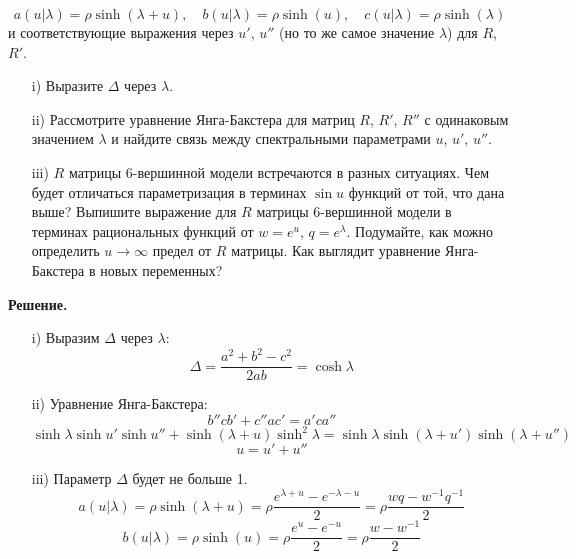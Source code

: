 \documentclass[12pt]{article}
\theoremstyle{definition}
\begin{document}
\begin{enumerate}
\begin{equation}
        a(u|\lambda)=\rho\sinh(\lambda+u),\quad b(u|\lambda)=\rho\sinh(u),\quad c(u|\lambda)=\rho\sinh(\lambda)
    \end{equation}
    и соответствующие выражения через $u'$, $u''$ (но то же самое значение $\lambda$) для $R$, $R'$.
    \begin{itemize}
        \item[i)] Выразите $\Delta$ через $\lambda$.
        \item[ii)] Рассмотрите уравнение Янга-Бакстера для матриц $R$, $R'$, $R''$ с одинаковым значением $\lambda$ и найдите связь между спектральными параметрами $u$, $u'$, $u''$.
        \item[iii)] $R$ матрицы 6-вершинной модели встречаются в разных ситуациях. Чем будет отличаться параметризация в терминах $\sin u$ функций от той, что дана выше? Выпишите выражение для $R$ матрицы 6-вершинной модели в терминах рациональных функций от $w=e^u$, $q=e^\lambda$. Подумайте, как можно определить $u\rightarrow\infty$ предел от $R$ матрицы. Как выглядит уравнение Янга-Бакстера в новых переменных?
    \end{itemize}
    \textbf{Решение.}
    \begin{itemize}
        \item[i)] Выразим $\Delta$ через $\lambda$:
        \begin{equation}
            \boxed{\Delta=\frac{a^2+b^2-c^2}{2ab}=\cosh\lambda}
        \end{equation}
        \item[ii)] Уравнение Янга-Бакстера:
        \begin{equation}
            b''cb'+c''ac'=a'ca''
        \end{equation}
        \begin{equation}
            \sinh\lambda\sinh u'\sinh u''+\sinh(\lambda+u)\sinh^2\lambda=\sinh\lambda\sinh(\lambda+u')\sinh(\lambda+u'')
        \end{equation}
        \begin{equation}
            \boxed{u=u'+u''}
        \end{equation}
        \item[iii)] Параметр $\Delta$ будет не больше 1.
        \begin{equation}
            a(u|\lambda)=\rho\sinh(\lambda+u)=\rho\frac{e^{\lambda+u}-e^{-\lambda-u}}{2}=\rho\frac{wq-w^{-1}q^{-1}}{2}
        \end{equation}
        \begin{equation}
            b(u|\lambda)=\rho\sinh(u)=\rho\frac{e^u-e^{-u}}{2}=\rho\frac{w-w^{-1}}{2}

\end{equation}
\end{itemize}
\end{enumerate}
\end{document}
